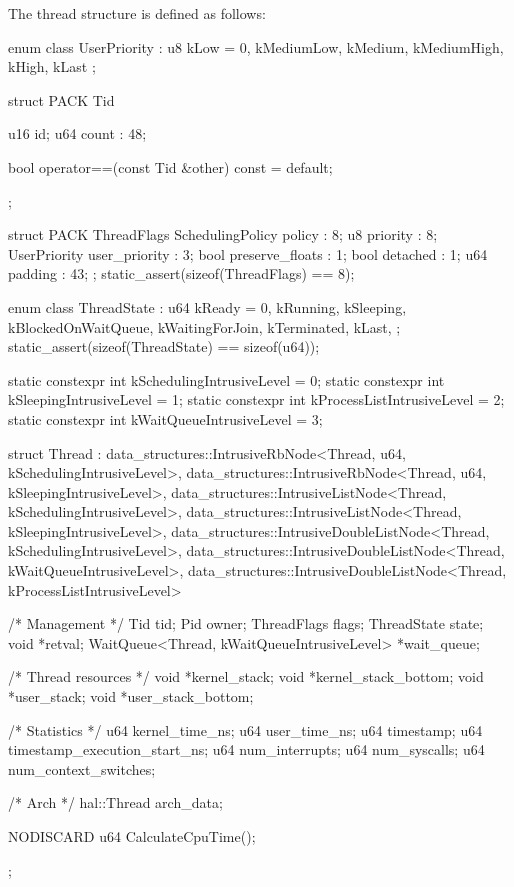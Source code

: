 \documentclass[a4paper,10pt,twoside]{report}
\theoremstyle{definition}
\begin{document}
The thread structure is defined as follows:

\begin{cppcode}[caption={Thread Structure}, label={lst:threadStruct}]
enum class UserPriority : u8 { kLow = 0, kMediumLow, kMedium, kMediumHigh, kHigh, kLast };

struct PACK Tid {
    u16 id;
    u64 count : 48;

    bool operator==(const Tid &other) const = default;
};

struct PACK ThreadFlags {
    SchedulingPolicy policy : 8;
    u8 priority : 8;
    UserPriority user_priority : 3;
    bool preserve_floats : 1;
    bool detached : 1;
    u64 padding : 43;
};
static_assert(sizeof(ThreadFlags) == 8);

enum class ThreadState : u64 {
    kReady = 0,
    kRunning,
    kSleeping,
    kBlockedOnWaitQueue,
    kWaitingForJoin,
    kTerminated,
    kLast,
};
static_assert(sizeof(ThreadState) == sizeof(u64));

static constexpr int kSchedulingIntrusiveLevel  = 0;
static constexpr int kSleepingIntrusiveLevel    = 1;
static constexpr int kProcessListIntrusiveLevel = 2;
static constexpr int kWaitQueueIntrusiveLevel   = 3;

struct Thread : data_structures::IntrusiveRbNode<Thread, u64, kSchedulingIntrusiveLevel>,
                data_structures::IntrusiveRbNode<Thread, u64, kSleepingIntrusiveLevel>,
                data_structures::IntrusiveListNode<Thread, kSchedulingIntrusiveLevel>,
                data_structures::IntrusiveListNode<Thread, kSleepingIntrusiveLevel>,
                data_structures::IntrusiveDoubleListNode<Thread, kSchedulingIntrusiveLevel>,
                data_structures::IntrusiveDoubleListNode<Thread, kWaitQueueIntrusiveLevel>,
                data_structures::IntrusiveDoubleListNode<Thread, kProcessListIntrusiveLevel> {
    /* Management */
    Tid tid;
    Pid owner;
    ThreadFlags flags;
    ThreadState state;
    void *retval;
    WaitQueue<Thread, kWaitQueueIntrusiveLevel> *wait_queue;

    /* Thread resources */
    void *kernel_stack;
    void *kernel_stack_bottom;
    void *user_stack;
    void *user_stack_bottom;

    /* Statistics */
    u64 kernel_time_ns;
    u64 user_time_ns;
    u64 timestamp;
    u64 timestamp_execution_start_ns;
    u64 num_interrupts;
    u64 num_syscalls;
    u64 num_context_switches;

    /* Arch */
    hal::Thread arch_data;

    NODISCARD u64 CalculateCpuTime();
};
\end{cppcode}
\end{document}

